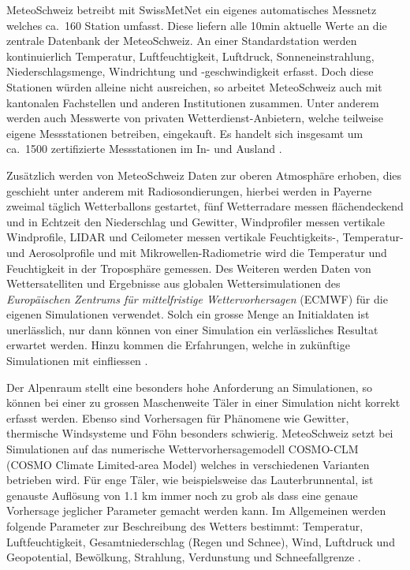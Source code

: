 \begin{refsection}
MeteoSchweiz betreibt mit SwissMetNet
%
ein eigenes
automatisches Messnetz welches ca.~160 Station umfasst. Diese liefern
alle 10min aktuelle Werte an die zentrale Datenbank der MeteoSchweiz.
An einer Standardstation werden kontinuierlich Temperatur,
Luftfeuchtigkeit, Luftdruck, Sonneneinstrahlung, Niederschlagsmenge,
Windrichtung und -geschwindigkeit erfasst. Doch diese Stationen
würden alleine nicht ausreichen, so arbeitet MeteoSchweiz auch mit
kantonalen Fachstellen und anderen Institutionen zusammen. Unter
anderem werden auch Messwerte von privaten Wetterdienst-Anbietern,
welche teilweise eigene Messstationen betreiben, eingekauft. Es
handelt sich insgesamt um ca.~1500 zertifizierte Messstationen im
In- und Ausland \cite{klima:meteoschweiz}.

Zusätzlich werden von MeteoSchweiz Daten zur oberen Atmosphäre
erhoben, dies geschieht unter anderem mit Radiosondierungen, hierbei
werden in Payerne zweimal täglich Wetterballons gestartet, fünf
Wetterradare messen flächendeckend und in Echtzeit den Niederschlag
und Gewitter, Windprofiler messen vertikale Windprofile, LIDAR und
Ceilometer messen vertikale Feuchtigkeits-, Temperatur- und
Aerosolprofile und mit Mikrowellen-Radiometrie wird die  Temperatur
und Feuchtigkeit in der Troposphäre gemessen. Des Weiteren werden
Daten von Wettersatelliten und Ergebnisse aus globalen Wettersimulationen
des {\em Europäischen Zentrums für mittelfristige Wettervorhersagen}
(ECMWF)
%
für die eigenen Simulationen verwendet. Solch ein grosse Menge an
Initialdaten ist unerlässlich, nur dann können von einer Simulation
ein verlässliches Resultat erwartet werden. Hinzu kommen die
Erfahrungen, welche in zukünftige Simulationen mit einfliessen
\cite{klima:meteoschweiz}.

Der Alpenraum stellt eine besonders hohe Anforderung an Simulationen,
so können bei einer zu grossen Maschenweite Täler in einer Simulation
nicht korrekt erfasst werden. Ebenso sind Vorhersagen  für Phänomene
wie Gewitter, thermische Windsysteme und Föhn besonders schwierig.
MeteoSchweiz setzt bei Simulationen auf das numerische
Wettervorhersagemodell COSMO-CLM (COSMO Climate Limited-area Model)
welches in verschiedenen Varianten betrieben wird. Für enge Täler,
wie beispielsweise das Lauterbrunnental, ist genauste Auflösung von
1.1 km immer noch zu grob als dass eine genaue Vorhersage jeglicher
Parameter gemacht werden kann.
Im Allgemeinen werden folgende Parameter zur Beschreibung des Wetters
bestimmt: Temperatur, Luftfeuchtigkeit, Gesamtniederschlag (Regen
und Schnee), Wind, Luftdruck und Geopotential, Bewölkung, Strahlung,
Verdunstung und Schneefallgrenze \cite{klima:tagi1} \cite{klima:tagi2}.


\end{refsection}
